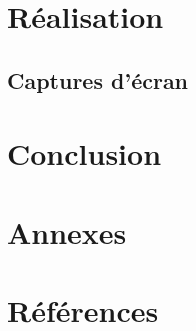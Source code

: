\documentclass[a4paper, 12pt]{article}
\begin{document}
\section{Réalisation}
\subsection{Captures d'écran}

\section{Conclusion}

\section{Annexes}

\section{Références}


\end{document}
